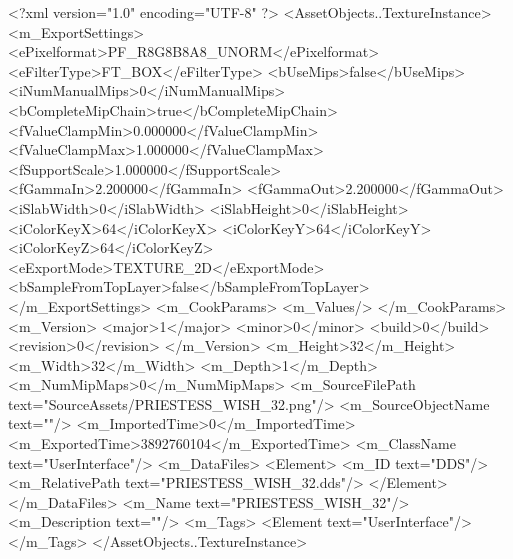 <?xml version="1.0" encoding="UTF-8" ?>
<AssetObjects..TextureInstance>
	<m_ExportSettings>
		<ePixelformat>PF_R8G8B8A8_UNORM</ePixelformat>
		<eFilterType>FT_BOX</eFilterType>
		<bUseMips>false</bUseMips>
		<iNumManualMips>0</iNumManualMips>
		<bCompleteMipChain>true</bCompleteMipChain>
		<fValueClampMin>0.000000</fValueClampMin>
		<fValueClampMax>1.000000</fValueClampMax>
		<fSupportScale>1.000000</fSupportScale>
		<fGammaIn>2.200000</fGammaIn>
		<fGammaOut>2.200000</fGammaOut>
		<iSlabWidth>0</iSlabWidth>
		<iSlabHeight>0</iSlabHeight>
		<iColorKeyX>64</iColorKeyX>
		<iColorKeyY>64</iColorKeyY>
		<iColorKeyZ>64</iColorKeyZ>
		<eExportMode>TEXTURE_2D</eExportMode>
		<bSampleFromTopLayer>false</bSampleFromTopLayer>
	</m_ExportSettings>
	<m_CookParams>
		<m_Values/>
	</m_CookParams>
	<m_Version>
		<major>1</major>
		<minor>0</minor>
		<build>0</build>
		<revision>0</revision>
	</m_Version>
	<m_Height>32</m_Height>
	<m_Width>32</m_Width>
	<m_Depth>1</m_Depth>
	<m_NumMipMaps>0</m_NumMipMaps>
	<m_SourceFilePath text="SourceAssets/PRIESTESS_WISH_32.png"/>
	<m_SourceObjectName text=""/>
	<m_ImportedTime>0</m_ImportedTime>
	<m_ExportedTime>3892760104</m_ExportedTime>
	<m_ClassName text="UserInterface"/>
	<m_DataFiles>
		<Element>
			<m_ID text="DDS"/>
			<m_RelativePath text="PRIESTESS_WISH_32.dds"/>
		</Element>
	</m_DataFiles>
	<m_Name text="PRIESTESS_WISH_32"/>
	<m_Description text=""/>
	<m_Tags>
		<Element text="UserInterface"/>
	</m_Tags>
</AssetObjects..TextureInstance>

